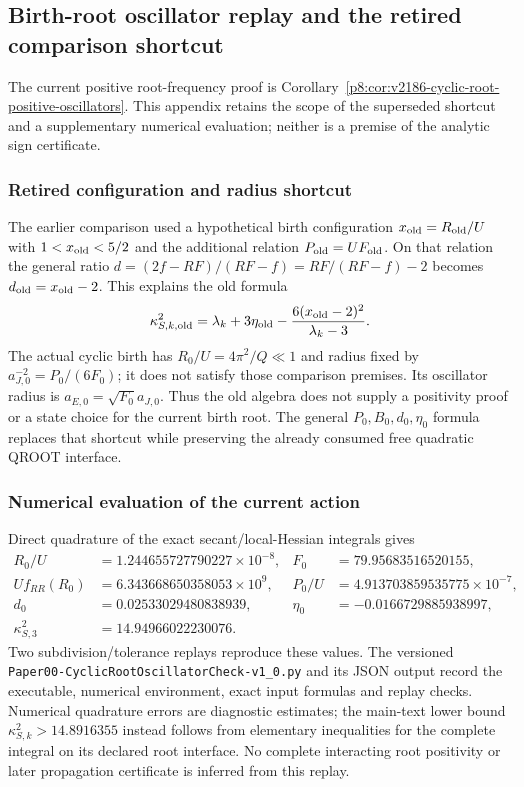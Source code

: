 \documentclass[12pt,a4paper]{article}
\begin{document}
\subsection{Birth-root oscillator replay and the retired comparison shortcut}
\label{p8:app:v2186-root-oscillator-diagnostics}

The current positive root-frequency proof is
Corollary~\ref{p8:cor:v2186-cyclic-root-positive-oscillators}. This appendix
retains the scope of the superseded shortcut and a supplementary numerical
evaluation; neither is a premise of the analytic sign certificate.

\subsubsection{Retired configuration and radius shortcut}
The earlier comparison used a hypothetical birth configuration
$x_{\rm old}=R_{\rm old}/U$ with $1<x_{\rm old}<5/2$ and the additional
relation $P_{\rm old}=UF_{\rm old}$. On that relation the general ratio
$d=(2f-RF)/(RF-f)=RF/(RF-f)-2$ becomes
$d_{\rm old}=x_{\rm old}-2$. This explains the old formula
\[
 \kappa_{S,k,\rm old}^2
 =\lambda_k+3\eta_{\rm old}
 -\frac{6(x_{\rm old}-2)^2}{\lambda_k-3}.
\]
The actual cyclic birth has $R_0/U=4\pi^2/Q\ll1$ and radius fixed by
$a_{J,0}^{-2}=P_0/(6F_0)$; it does not satisfy those comparison premises.
Its oscillator radius is $a_{E,0}=\sqrt{F_0}a_{J,0}$. Thus the old algebra
does not supply a positivity proof or a state choice for the current birth
root. The general $P_0,B_0,d_0,\eta_0$ formula replaces that shortcut while
preserving the already consumed free quadratic QROOT interface.

\subsubsection{Numerical evaluation of the current action}
Direct quadrature of the exact secant/local-Hessian integrals gives
\[
\begin{aligned}
 R_0/U&=1.244655727790227\times10^{-8},&
 F_0&=79.95683516520155,\\
 Uf_{RR}(R_0)&=6.343668650358053\times10^9,&
 P_0/U&=4.913703859535775\times10^{-7},\\
 d_0&=0.02533029480838939,&
 \eta_0&=-0.0166729885938997,\\
 \kappa_{S,3}^2&=14.94966022230076.&
\end{aligned}
\]
Two subdivision/tolerance replays reproduce these values. The versioned
\texttt{Paper00-\allowbreak CyclicRoot\allowbreak Oscillator\allowbreak Check-v1\_0.py} and its JSON output
record the executable, numerical environment, exact input formulas and
replay checks. Numerical quadrature errors are diagnostic estimates; the
main-text lower bound $\kappa_{S,k}^2>14.8916355$ instead follows from
elementary inequalities for the complete integral on its declared root
interface. No complete interacting root positivity or later propagation
certificate is inferred from this replay.
\end{document}
